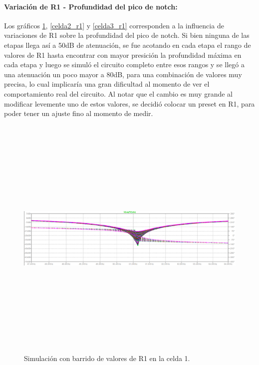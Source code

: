 \paragraph{Variaci\'on de R1 - Profundidad del pico de notch:} Los gr\'aficos \ref{celda1_r1}, \ref{celda2_r1} y \ref{celda3_r1} corresponden a la influencia de variaciones de R1 sobre la profundidad del pico de notch. Si bien ninguna de las etapas llega as\'i a 50dB de atenuaci\'on, se fue acotando en cada etapa el rango de valores de R1 hasta encontrar con mayor presici\'on la profundidad m\'axima en cada etapa y luego se simul\'o el circuito completo entre esos rangos y se lleg\'o a una atenuaci\'on un poco mayor a 80dB, para una combinaci\'on de valores muy precisa, lo cual implicar\'ia una gran dificultad al momento de ver el comportamiento real del circuito. Al notar que el cambio es muy grande al modificar levemente uno de estos valores, se decidi\'o colocar un preset en R1, para poder tener un ajuste fino al momento de medir. 

 \begin{figure}[H] %
	\centering	\includegraphics[width=12cm,height=12cm,keepaspectratio]{../EJ4/graficos/etapa1_R1.png}
	\caption{Simulaci\'on con barrido de valores de R1 en la celda 1.}
	\label{celda1_r1}
\end{figure}


